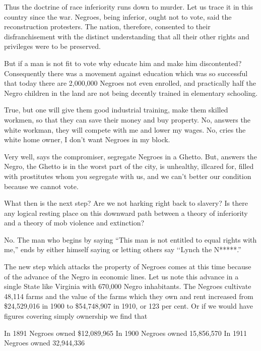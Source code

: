 \documentclass[letterpaper,10pt,english]{jupyterBook}
\begin{document}
\sphinxAtStartPar
Thus the doctrine of race inferiority runs down to murder. Let us trace it in this country since the war. Negroes, being inferior, ought not to vote, said the reconstruction protesters. The nation, therefore, consented to their disfranchisement with the distinct understanding that all their other rights and privileges were to be preserved.

\sphinxAtStartPar
But if a man is not fit to vote why educate him and make him discontented? Consequently there was a movement against education which was so successful that to\sphinxhyphen{}day there are 2,000,000 Negroes not even enrolled, and practically half the Negro children in the land are not being decently trained in elementary schooling.

\sphinxAtStartPar
True, but one will give them good industrial training, make them skilled workmen, so that they can save their money and buy property. No, answers the white workman, they will compete with me and lower my wages. No, cries the white home owner, I don’t want Negroes in my block.

\sphinxAtStartPar
Very well, says the compromiser, segregate Negroes in a Ghetto. But, answers the Negro, the Ghetto is in the worst part of the city, is unhealthy, ill\sphinxhyphen{}cared for, filled with prostitutes whom you segregate with us, and we can’t better our condition because we cannot vote.

\sphinxAtStartPar
What then is the next step? Are we not harking right back to slavery? Is there any logical resting place on this downward path between a theory of inferiority and a theory of mob violence and extinction?

\sphinxAtStartPar
No. The man who begins by saying “This man is not entitled to equal rights with me,” ends by either himself saying or letting others say ‘‘Lynch the N*****.”

\sphinxAtStartPar
The new step which attacks the property of Negroes comes at this time because of the advance of the Negro in economic lines. Let us note this advance in a single State like Virginia with 670,000 Negro inhabitants. The Negroes cultivate 48,114 farms and the value of the farms which they own and rent increased from \$24,529,016 in 1900 to \$54,748,907 in 1910, or 123 per cent. Or if we would have figures covering simply ownership we find that

\sphinxAtStartPar
In 1891 Negroes owned \$12,089,965
In 1900 Negroes owned 15,856,570
In 1911 Negroes owned 32,944,336
\end{document}
